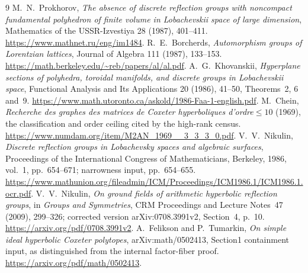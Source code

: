 \documentclass[11pt]{article}
\theoremstyle{remark}\newtheorem{remark}[theorem]{Remark}
\begin{document}
\begin{thebibliography}{9}
 M.~N.~Prokhorov,
\emph{The absence of discrete reflection groups with noncompact
fundamental polyhedron of finite volume in Lobachevskii space of
large dimension}, Mathematics of the USSR-Izvestiya 28 (1987),
401--411.
\url{https://www.mathnet.ru/eng/im1484}.
 R.~E.~Borcherds,
\emph{Automorphism groups of Lorentzian lattices}, Journal of Algebra
111 (1987), 133--153.
\url{https://math.berkeley.edu/~reb/papers/al/al.pdf}.
 A.~G.~Khovanskii,
\emph{Hyperplane sections of polyhedra, toroidal manifolds, and discrete
groups in Lobachevskii space}, Functional Analysis and Its Applications
20 (1986), 41--50, Theorems~2, 6 and~9.
\url{https://www.math.utoronto.ca/askold/1986-Faa-1-english.pdf}.
 M.~Chein,
\emph{Recherche des graphes des matrices de Coxeter hyperboliques
d'ordre$\le10$} (1969), the classification and order ceiling cited by
the high-rank census.
\url{https://www.numdam.org/item/M2AN_1969__3_3_3_0.pdf}.
 V.~V.~Nikulin,
\emph{Discrete reflection groups in Lobachevsky spaces and algebraic
surfaces}, Proceedings of the International Congress of Mathematicians,
Berkeley, 1986, vol.~1, pp.~654--671; narrowness input, pp.~654--655.
\url{https://www.mathunion.org/fileadmin/ICM/Proceedings/ICM1986.1/ICM1986.1.ocr.pdf}.
 V.~V.~Nikulin,
\emph{On ground fields of arithmetic hyperbolic reflection groups},
in \emph{Groups and Symmetries}, CRM Proceedings and Lecture Notes~47
(2009), 299--326; corrected version arXiv:0708.3991v2,
Section~4, p.~10.
\url{https://arxiv.org/pdf/0708.3991v2}.
 A.~Felikson and P.~Tumarkin,
\emph{On simple ideal hyperbolic Coxeter polytopes}, arXiv:math/0502413,
Section1 containment input, as distinguished from the internal
factor-fiber proof.
\url{https://arxiv.org/pdf/math/0502413}.
\end{thebibliography}
\end{document}
